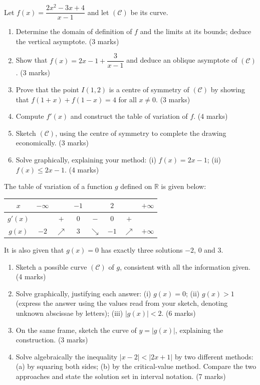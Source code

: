 \documentclass[11pt]{article}
\begin{document}
\begin{exercice}
Let $f(x)=\dfrac{2x^{2}-3x+4}{x-1}$ and let $(\mathcal{C})$ be its curve.
\begin{enumerate}
\item Determine the domain of definition of $f$ and the limits at its bounds; deduce the vertical asymptote. \hfill(3 marks)
\item Show that $f(x)=2x-1+\dfrac{3}{x-1}$ and deduce an oblique asymptote of $(\mathcal{C})$. \hfill(3 marks)
\item Prove that the point $I(1,2)$ is a centre of symmetry of $(\mathcal{C})$ by showing that $f(1+x)+f(1-x)=4$ for all $x\neq 0$. \hfill(3 marks)
\item Compute $f'(x)$ and construct the table of variation of $f$. \hfill(4 marks)
\item Sketch $(\mathcal{C})$, using the centre of symmetry to complete the drawing economically. \hfill(3 marks)
\item Solve graphically, explaining your method: (i) $f(x)=2x-1$; (ii) $f(x)\leq 2x-1$. \hfill(4 marks)
\end{enumerate}
\end{exercice}

\begin{exercice}
The table of variation of a function $g$ defined on $\mathbb{R}$ is given below:
\begin{center}
\begin{tabular}{|c|ccccccc|}
\hline
$x$ & $-\infty$ & & $-1$ & & $2$ & & $+\infty$ \\
\hline
$g'(x)$ & & $+$ & $0$ & $-$ & $0$ & $+$ & \\
\hline
$g(x)$ & $-2$ & $\nearrow$ & $3$ & $\searrow$ & $-1$ & $\nearrow$ & $+\infty$ \\
\hline
\end{tabular}
\end{center}
It is also given that $g(x)=0$ has exactly three solutions $-2$, $0$ and $3$.
\begin{enumerate}
\item Sketch a possible curve $(\mathcal{C})$ of $g$, consistent with all the information given. \hfill(4 marks)
\item Solve graphically, justifying each answer: (i) $g(x)=0$; (ii) $g(x)>1$ (express the answer using the values read from your sketch, denoting unknown abscissae by letters); (iii) $|g(x)|<2$. \hfill(6 marks)
\item On the same frame, sketch the curve of $y=|g(x)|$, explaining the construction. \hfill(3 marks)
\item Solve algebraically the inequality $|x-2|<|2x+1|$ by two different methods: (a) by squaring both sides; (b) by the critical-value method. Compare the two approaches and state the solution set in interval notation. \hfill(7 marks)
\end{enumerate}
\end{exercice}
\end{document}
